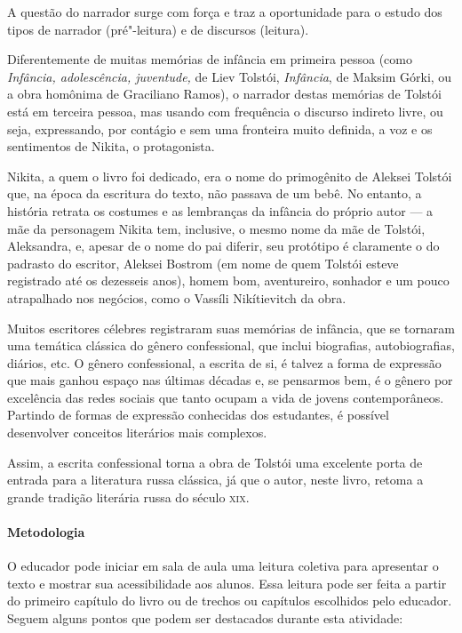 \documentclass[11pt]{extarticle}
\begin{document}
A questão do narrador surge com força e traz a oportunidade para o
estudo dos tipos de narrador (pré"-leitura) e de discursos (leitura).

Diferentemente de muitas memórias de infância em primeira pessoa (como
\emph{Infância, adolescência, juventude,} de Liev Tolstói,
\emph{Infância}, de Maksim Górki, ou a obra homônima de Graciliano
Ramos), o narrador destas memórias de Tolstói está em terceira pessoa,
mas usando com frequência o discurso indireto livre, ou seja,
expressando, por contágio e sem uma fronteira muito definida, a voz e os
sentimentos de Nikita, o protagonista.

Nikita, a quem o livro foi dedicado, era o nome do primogênito de
Aleksei Tolstói que, na época da escritura do texto, não passava de um
bebê. No entanto, a história retrata os costumes e as lembranças da infância do
próprio autor --- a mãe da personagem Nikita tem, inclusive, o mesmo
nome da mãe de Tolstói, Aleksandra, e, apesar de o nome do pai diferir,
seu protótipo é claramente o do padrasto do escritor, Aleksei Bostrom
(em nome de quem Tolstói esteve registrado até os dezesseis anos), homem
bom, aventureiro, sonhador e um pouco atrapalhado nos negócios, como o
Vassíli Nikítievitch da obra.

Muitos escritores célebres registraram suas memórias de infância, que se
tornaram uma temática clássica do gênero confessional, que inclui
biografias, autobiografias, diários, etc. O gênero confessional, a
escrita de si, é talvez a forma de expressão que mais ganhou espaço nas
últimas décadas e, se pensarmos bem, é o gênero por excelência das redes
sociais que tanto ocupam a vida de jovens contemporâneos. Partindo de
formas de expressão conhecidas dos estudantes, é possível desenvolver
conceitos literários mais complexos.

Assim, a escrita confessional torna a obra de Tolstói uma excelente
porta de entrada para a literatura russa clássica, já que o autor, neste
livro, retoma a grande tradição literária russa do século \textsc{xix}.

\paragraph{Metodologia}
O educador pode iniciar em sala de aula uma leitura coletiva para
apresentar o texto e mostrar sua acessibilidade aos alunos. Essa leitura
pode ser feita a partir do primeiro capítulo do livro ou de trechos ou
capítulos escolhidos pelo educador. Seguem alguns pontos que podem ser
destacados durante esta atividade:
\end{document}
